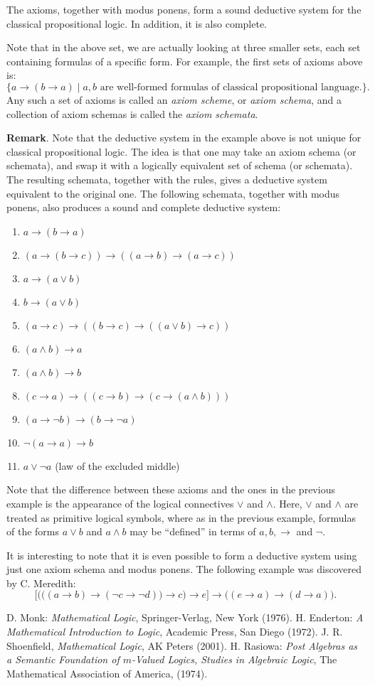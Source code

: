\documentclass[12pt]{article}
\begin{document}
The axioms, together with modus ponens, form a sound deductive system for the classical propositional logic.  In addition, it is also complete.

Note that in the above set, we are actually looking at three smaller sets, each set containing formulas of a specific form.  For example, the first sets of axioms above is: $$\lbrace a\to (b\to a)\mid a,b\mbox{ are well-formed formulas of classical propositional language.}\rbrace.$$
Any such a set of axioms is called an \emph{axiom scheme}, or \emph{axiom schema}, and a collection of axiom schemas is called the \emph{axiom schemata}.

\textbf{Remark}.  Note that the deductive system in the example above is not unique for classical propositional logic.  The idea is that one may take an axiom schema (or schemata), and swap it with a logically equivalent set of schema (or schemata).  The resulting schemata, together with the rules, gives a deductive system equivalent to the original one.  The following schemata, together with modus ponens, also produces a sound and complete deductive system:
\begin{enumerate}
\item $a\to (b\to a)$
\item $(a\to(b\to c))\to ((a\to b)\to(a\to c))$
\item $a\to (a\vee b)$
\item $b\to (a\vee b)$
\item $(a\to c)\to ((b\to c)\to((a\vee b)\to c))$
\item $(a\wedge b)\to a$
\item $(a\wedge b)\to b$
\item $(c\to a)\to ((c\to b)\to (c\to (a\wedge b)))$
\item $(a\to \neg b)\to (b\to \neg a)$
\item $\neg(a\to a)\to b$
\item $a\vee \neg a$ (law of the excluded middle)
\end{enumerate}
Note that the difference between these axioms and the ones in the previous example is the appearance of the logical connectives $\vee$ and $\wedge$.  Here, $\vee$ and $\wedge$ are treated as primitive logical symbols, where as in the previous example, formulas of the forms $a\vee b$ and $a\wedge b$ may be ``defined'' in terms of $a,b,\to$ and $\neg$.

It is interesting to note that it is even possible to form a deductive system using just one axiom schema and modus ponens.  The following example was discovered by C. Meredith:
$$\Big[\Big(\big((a\to b)\to (\neg c\to \neg d)\big)\to c\Big)\to e\Big]\to \big((e\to a)\to (d\to a)\big).$$

\begin{thebibliography}{7}
 D. Monk: {\em Mathematical Logic}, Springer-Verlag, New York (1976).
 H. Enderton: {\em A Mathematical Introduction to Logic}, Academic Press, San Diego (1972).
 J. R. Shoenfield, {\it Mathematical Logic}, AK Peters (2001).
 H. Rasiowa: {\em Post Algebras as a Semantic Foundation of $m$-Valued Logics, Studies in Algebraic Logic}, The Mathematical Association of America, (1974).
\end{thebibliography}
\end{document}

